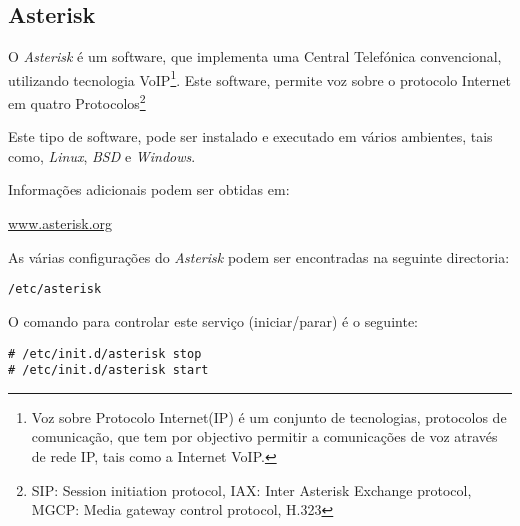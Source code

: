 \subsection{Asterisk}

O \emph{Asterisk} é um software, que implementa uma Central Telefónica convencional, utilizando tecnologia \textsf{VoIP}\footnote{Voz sobre Protocolo Internet(IP) é um conjunto de tecnologias, protocolos de comunicação, que tem por objectivo permitir a comunicações de voz através de rede IP, tais como a Internet \textsf{VoIP}.}. Este software, permite voz sobre o protocolo Internet em quatro Protocolos\footnote{SIP: Session initiation protocol, IAX:  Inter Asterisk Exchange protocol, MGCP: Media gateway control protocol, H.323}  


Este tipo de software, pode ser instalado e executado em vários ambientes, tais como, \emph{Linux}, \emph{BSD} e \emph{Windows}.

Informações adicionais podem ser obtidas em:\\ \begin{normalsize}\sffamily\href{http://www.asterisk.org/}{www.asterisk.org}\end{normalsize}

As várias configurações do \emph{Asterisk} podem ser encontradas na seguinte directoria:

\begin{Verbatim}[commandchars=\\\{\}]
/etc/asterisk
\end{Verbatim}

O comando para controlar este serviço (iniciar/parar) é o seguinte:

\begin{Verbatim}[commandchars=\\\{\}]
# /etc/init.d/asterisk stop
# /etc/init.d/asterisk start
\end{Verbatim}

